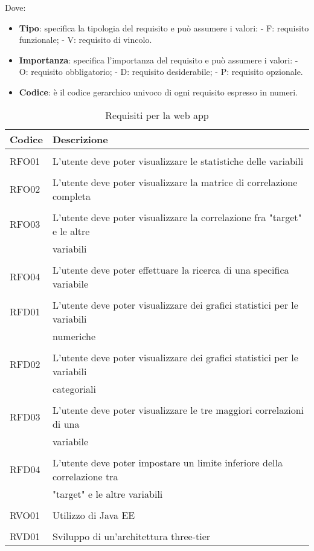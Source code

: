 Dove:
\begin{itemize}
	\item \textbf{Tipo}: specifica la tipologia del requisito e può assumere i valori:
	\subitem - F: requisito funzionale;
	\subitem - V: requisito di vincolo.
	\item \textbf{Importanza}: specifica l'importanza del requisito e può assumere i valori:
	\subitem - O: requisito obbligatorio;
	\subitem - D: requisito desiderabile;
	\subitem - P: requisito opzionale.
	\item  \textbf{Codice}: è il codice gerarchico univoco di ogni requisito espresso in numeri.
\end{itemize} 
\clearpage
\begin{table}[!h] %
	\caption{Requisiti per la web app} \label{req-web-app}
	\label{tab:requisiti-app}
	\centering
	\begin{tabular}{ l | l }
		\textbf{Codice} & \textbf{Descrizione}\\
		\hline
		\hline
		\\[-2.5mm]
		RFO01 & L'utente deve poter visualizzare le statistiche delle variabili \\
		\hline
		\\[-2.5mm]
		RFO02 & L'utente deve poter visualizzare la matrice di correlazione completa \\
		\hline
		\\[-2.5mm]
		RFO03 & L'utente deve poter visualizzare la correlazione fra "target" e le altre \\ & variabili \\
		\hline
		\\[-2.5mm]
		RFO04 & L'utente deve poter effettuare la ricerca di una specifica variabile \\
		\hline
		\hline
		\\[-2.5mm]
		RFD01 & L'utente deve poter visualizzare dei grafici statistici per le variabili \\ & numeriche \\
		\hline
		\\[-2.5mm]
		RFD02 & L'utente deve poter visualizzare dei grafici statistici per le variabili \\ & categoriali \\
		\hline
		\\[-2.5mm]
		RFD03 & L'utente deve poter visualizzare le tre maggiori correlazioni di una \\ 
		& variabile \\
		\hline
		\\[-2.5mm]
		RFD04 & L'utente deve poter impostare un limite inferiore della correlazione tra \\ & "target" e le altre variabili \\
		\hline
		\hline
		\\[-2.5mm]
		RVO01 & Utilizzo di Java EE \\
		\hline
		\hline
		\\[-2.5mm]
		RVD01 & Sviluppo di un'architettura three-tier \\
		\hline
		\end{tabular}
\end{table}%
